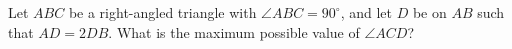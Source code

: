 Let $ABC$ be a right-angled triangle with $\angle ABC = 90^\circ$, and let $D$
be on $AB$ such that $AD = 2DB$. What is the maximum possible value of $\angle
ACD$?
